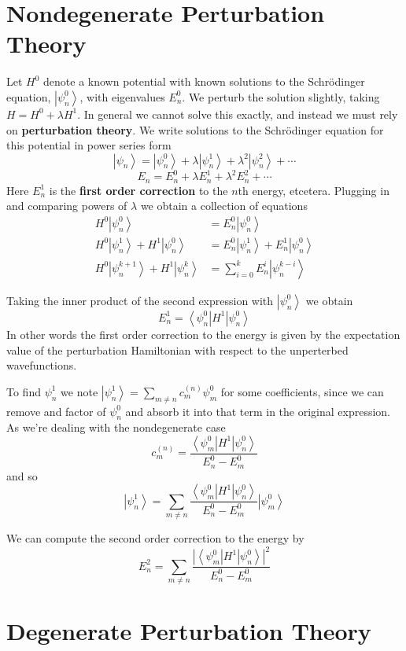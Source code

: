 \documentclass[12pt, a4paper, oneside, openright, titlepage]{book}
\newcommand{\bra}[1]{\left\langle#1\right\vert}
\newcommand{\ket}[1]{\left\vert#1\right\rangle}
\begin{document}
\section{Nondegenerate Perturbation Theory}

Let $H^0$ denote a known potential with known solutions to the Schr\"{o}dinger equation, $\ket{\psi_n^0}$, with eigenvalues $E_n^0$. We perturb the solution slightly, taking $H = H^0 + \lambda H^1$. In general we cannot solve this exactly, and instead we must rely on \textbf{perturbation theory}. We write solutions to the Schr\"{o}dinger equation for this potential in power series form $$\ket{\psi_n} = \ket{\psi_n^0}+\lambda\ket{\psi_n^1}+\lambda^2\ket{\psi_n^2}+\cdots$$
$$E_n = E_n^0+\lambda E_n^1+\lambda^2 E_n^2+\cdots$$
Here $E_n^1$ is the \textbf{first order correction} to the $n$th energy, etcetera. Plugging in and comparing powers of $\lambda$ we obtain a collection of equations \begin{align*}
    H^0\ket{\psi_n^0} &= E_n^0\ket{\psi_n^0} \\
    H^0\ket{\psi_n^1}+H^1\ket{\psi_n^0} &= E_n^0\ket{\psi_n^1}+E_n^1\ket{\psi_n^0} \\
    H^0\ket{\psi_n^{k+1}}+H^1\ket{\psi_n^k} &= \sum_{i=0}^kE_n^i\ket{\psi_n^{k-i}}
\end{align*}

Taking the inner product of the second expression with $\ket{\psi_n^0}$ we obtain $$E_n^1 = \bra{\psi_n^0}H^1\ket{\psi_n^0}$$
In other words the first order correction to the energy is given by the expectation value of the perturbation Hamiltonian with respect to the unperterbed wavefunctions.

To find $\psi_n^1$ we note $\ket{\psi_n^1} = \sum_{m\neq n}c_m^{(n)}\psi_m^0$ for some coefficients, since we can remove and factor of $\psi_n^0$ and absorb it into that term in the original expression. As we're dealing with the nondegenerate case $$c_m^{(n)} = \frac{\bra{\psi_m^0}H^1\ket{\psi_n^0}}{E_n^0-E_m^0}$$
and so $$\ket{\psi_n^1} = \sum_{m\neq n}\frac{\bra{\psi_m^0}H^1\ket{\psi_n^0}}{E_n^0-E_m^0}\ket{\psi_m^0}$$

We can compute the second order correction to the energy by $$E_n^2 = \sum_{m\neq n}\frac{|\bra{\psi_m^0}H^1\ket{\psi_n^0}|^2}{E_n^0-E_m^0}$$


\section{Degenerate Perturbation Theory}
\end{document}
